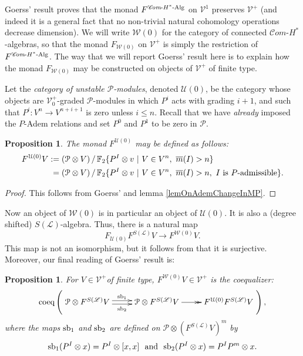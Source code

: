 \documentclass[11pt]{amsart}
\theoremstyle{plain}
\newtheorem{prop}[thm]{Proposition}
\theoremstyle{definition}
\renewcommand{\to}{\longrightarrow}
\newcommand{\scrL}{\mathscr{L}}
\newcommand{\scrC}{\mathscr{C}}
\newcommand{\calW}{\mathcal{W}}
\newcommand{\calU}{\mathcal{U}}
\newcommand{\calP}{\mathcal{P}}
\newcommand{\calV}{\mathcal{V}}
\newcommand{\calw}{\mathcal{W}}
\newcommand{\calu}{\mathcal{U}}
\theoremstyle{plain}
\newcommand{\Palg}{{\calP}}
\newcommand{\LieOperad}{{\scrL}}
\newcommand{\vect}[2]{\calV^{#1}_{#2}}
\newcommand{\HAlg}{\textup{-$H^*$-Alg}}
\newcommand{\minDimP}{\overline{m}}
\newcommand{\F}{\mathbb{F}}
\newcommand{\algs}{\scrC\!\textit{om}}
\begin{document}
\begin{Constructing homotopy and cohomotopy operations}
Goerss' result proves that the monad
$F^{\algs\HAlg}$ on $\vect{1}{}$
preserves $\vect{+}{}$ (and indeed it is a general fact that no non-trivial natural cohomology operations decrease dimension).
We will write $\calW(0)$ for the category of connected $\algs$-$H^*$-algebras, so that the monad $F_{\calW(0)}$ on $\vect{+}{}$ is simply the restriction of $F^{\algs\HAlg}$. The way that we will report Goerss' result here is to explain how the monad $F_{\calW(0)}$ may be constructed on objects of $\vect{+}{}$ of finite type.

Let the \emph{category of unstable $\Palg$-modules}, denoted $\calU(0)$, be the category whose objects are $\vect{+}{0}$-graded $\Palg$-modules in which $P^i$ acts with grading $i+1$, and such that $P^i:V^n\to V^{n+i+1}$ is zero unless $i\leq n$. Recall that  we have \emph{already} imposed the $P$-Adem relations and set $P^0$ and $P^1$ to be zero in $\Palg$. 
\begin{prop}
The monad $F^{\calU(0)}$ may be defined as follows:
\begin{alignat*}{2}
F^{\calU(0)}V
:={}&
(\Palg\otimes V)\,/\,\F_2\{P^I\otimes v\ |\ V\in V^n,\ \minDimP(I)>n \}%
\\
={}&
(\Palg\otimes V)\,/\,\F_2\{P^I\otimes v\ |\ V\in V^n,\ \minDimP(I)>n ,\ I\textup{ is $P$-admissible}\}.%
\end{alignat*}
\end{prop}
\begin{proof}
This follows from Goerss' \cite[Theorem I]{MR1089001} and lemma \ref{lemOnAdemChangeInMP}.
\end{proof}
Now an object of $\calw(0)$ is in particular an object of $\calU(0)$. It is also a (degree shifted) $S(\LieOperad)$-algebra. Thus, there  is a natural map 
\[F_{\calU(0)}F^{S(\LieOperad)}V\to F^{\calW(0)}V.\]
This map is not an isomorphism, but it follows from \cite[Theorem I]{MR1089001} that it is surjective. Moreover, our final reading of Goerss' result is:
\begin{prop}\label{partialgoerss}
For $V\in\vect{+}{}$of finite type,  $F^{\calW(0)}V\in \vect{+}{}$ is the coequalizer:
\[\textup{coeq}\left(\xymatrix@R=4mm{
\Palg\otimes F^{S(\LieOperad)}V
\ar@<+.5ex>[r]^-{\smash{\textup{sb}_1}}
\ar@<-.5ex>[r]_-{\textup{sb}_2}
&%
\Palg\otimes F^{S(\LieOperad)}V
\ar@{->>}[r]
&
F^{\calu(0)}F^{S(\LieOperad)}V%
}\right),\]
where the maps $\textup{sb}_1$ and $\textup{sb}_2$ are defined on  $\Palg\otimes(F^{S(\LieOperad)}V)^{m}$ by
\[\textup{sb}_1(P^I\otimes x)=P^I\otimes [x,x]\textup{ \ and \ }\textup{sb}_2(P^I\otimes x)=P^IP^m\otimes x.\]

\end{prop}
\end{Constructing homotopy and cohomotopy operations}
\end{document}
